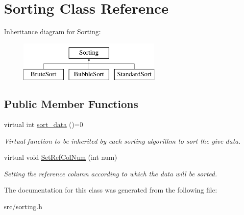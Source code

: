 \hypertarget{classSorting}{
\section{Sorting Class Reference}
\label{da/d2c/classSorting}
}
Inheritance diagram for Sorting:\begin{figure}[H]
\begin{center}
\leavevmode
\includegraphics[height=2cm]{da/d2c/classSorting}
\end{center}
\end{figure}
\subsection*{Public Member Functions}
\begin{DoxyCompactItemize}
\item 
\hypertarget{classSorting_a6686201265fbb31ba9c2071623742be1}{
virtual int \hyperlink{classSorting_a6686201265fbb31ba9c2071623742be1}{sort\_\-data} ()=0}
\label{da/d2c/classSorting_a6686201265fbb31ba9c2071623742be1}

\begin{DoxyCompactList}\small\item\em Virtual function to be inherited by each sorting algorithm to sort the give data. \item\end{DoxyCompactList}\item 
\hypertarget{classSorting_a835629d0133adcdcbf0c56ec05e67ad4}{
virtual void \hyperlink{classSorting_a835629d0133adcdcbf0c56ec05e67ad4}{SetRefColNum} (int num)}
\label{da/d2c/classSorting_a835629d0133adcdcbf0c56ec05e67ad4}

\begin{DoxyCompactList}\small\item\em Setting the reference column according to which the data will be sorted. \item\end{DoxyCompactList}\end{DoxyCompactItemize}


The documentation for this class was generated from the following file:\begin{DoxyCompactItemize}
\item 
src/sorting.h\end{DoxyCompactItemize}
